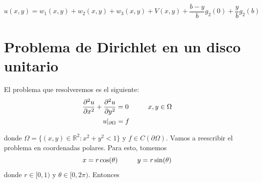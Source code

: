 \documentclass[11pt]{book}
\theoremstyle{plain}
\theoremstyle{definition}
\newcommand{\R}{\mathbb{R}}
\begin{document}
    \[
        u(x,y) = w_1(x,y) + w_2(x,y) + w_3(x,y) + V(x,y) + \frac{b-y}{b}g_{2}(0) + \frac{y}{b}g_{2}(b)
    \]

    \section{Problema de Dirichlet en un disco unitario}
    \setcounter{equation}{0}
    El problema que resolveremos es el siguiente:
    \begin{align}
        \frac{\partial^{2}u}{\partial x^{2}} + \frac{\partial^{2}u}{\partial y^{2}} &= 0 \hspace{10mm} x,y\in \Omega\\
        u|_{\partial \Omega} &= f
    \end{align}

    donde $\Omega = \{(x,y) \in \R^{2} : x^{2} + y^{2} < 1\}$ y $f \in C(\partial \Omega)$. Vamos a reescribir el problema en coordenadas polares. Para esto, tomemos
    \[
        x = r\cos(\theta) \hspace{10mm} y = r\sin(\theta)
    \]
    donde $r \in [0,1)$ y $\theta \in [0,2\pi)$. Entonces
\end{document}
